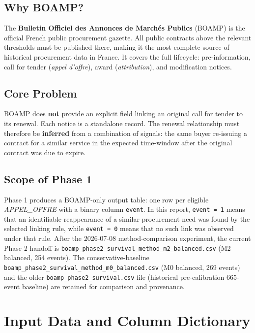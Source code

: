 \documentclass[12pt, a4paper]{article}
\begin{document}
\subsection{Why BOAMP?}

The \textbf{Bulletin Officiel des Annonces de March\'es Publics} (BOAMP) is the
official French public procurement gazette. All public contracts above the
relevant thresholds must be published there, making it the most complete source
of historical procurement data in France. It covers the full lifecycle:
pre-information, call for tender (\textit{appel d'offre}), award
(\textit{attribution}), and modification notices.

\subsection{Core Problem}

BOAMP does \textbf{not} provide an explicit field linking an original call for
tender to its renewal. Each notice is a standalone record. The renewal
relationship must therefore be \textbf{inferred} from a combination of signals:
the same buyer re-issuing a contract for a similar service in the expected
time-window after the original contract was due to expire.

\subsection{Scope of Phase 1}

Phase 1 produces a BOAMP-only output table: one row per eligible
\textit{APPEL\_OFFRE} with a binary column \texttt{event}. In this report,
\texttt{event = 1} means that an identifiable reappearance of a similar
procurement need was found by the selected linking rule, while
\texttt{event = 0} means that no such link was observed under that rule. After
the 2026-07-08 method-comparison experiment, the current Phase-2 handoff is
\texttt{boamp\_phase2\_survival\_method\_m2\_balanced.csv} (M2 balanced, 254
events). The conservative-baseline
\texttt{boamp\_phase2\_survival\_method\_m0\_balanced.csv} (M0 balanced, 269
events) and the older \texttt{boamp\_phase2\_survival.csv} file (historical
pre-calibration 665-event baseline) are retained for comparison and
provenance.

\section{Input Data and Column Dictionary}
\end{document}
